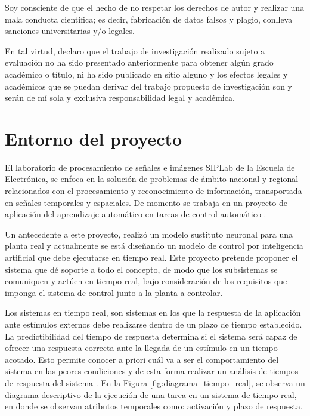 \documentclass[12pt]{article}
\begin{document}
Soy consciente de que el hecho de no respetar los derechos de autor y realizar una mala conducta científica; es decir, fabricación de datos falsos y plagio, conlleva
sanciones universitarias y/o legales.

En tal virtud, declaro que el trabajo de investigación realizado sujeto a evaluación no ha sido presentado anteriormente para obtener algún grado académico o título, ni ha sido publicado en sitio alguno y los efectos legales y académicos que se puedan derivar del trabajo propuesto de investigación son y serán de mí sola y exclusiva responsabilidad legal y académica.

\newpage
\tableofcontents

\newpage

\section{Entorno del proyecto}

El laboratorio de procesamiento de señales e imágenes SIPLab de la Escuela de Electrónica, se enfoca en la solución de problemas de ámbito nacional y regional relacionados con el procesamiento y reconocimiento de información, transportada en señales temporales y espaciales. De momento se trabaja en un proyecto de aplicación del aprendizaje automático en tareas de control automático  \cite{SIPLab} \cite{13_se}.

Un antecedente a este proyecto, \cite{15_tec} realizó un modelo sustituto neuronal para una planta real y actualmente se está diseñando un modelo de control por inteligencia artificial que debe ejecutarse en tiempo real. Este proyecto pretende proponer el sistema que dé soporte a todo el concepto, de modo que los subsistemas se comuniquen y actúen en tiempo real, bajo consideración de los requisitos que imponga el sistema de control junto a la planta a controlar. 

Los sistemas en tiempo real, son sistemas en los que la respuesta de la aplicación ante estímulos externos debe realizarse dentro de un plazo de tiempo establecido. La predictibilidad del tiempo de respuesta determina si el sistema será capaz de ofrecer una respuesta correcta ante la llegada de un estímulo en un tiempo acotado. Esto permite conocer a priori cuál va a ser el comportamiento del sistema en las peores condiciones y de esta forma realizar un análisis de tiempos de respuesta del sistema \cite{alonso2010panoramica}. En la Figura \ref{fig:diagrama_tiempo_real}, se observa un diagrama descriptivo de la ejecución de una tarea en un sistema de tiempo real, en donde se observan atributos temporales como: activación y plazo de respuesta\cite{de2000introduccion}.
\end{document}
